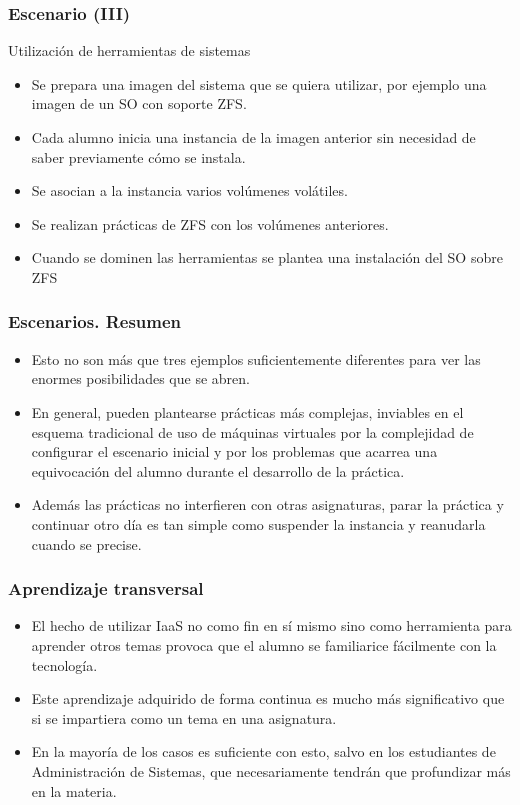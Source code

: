 \documentclass{beamer}
\begin{document}
\begin{frame}
  \frametitle{Escenario (III)}
  \begin{description}
  \item[Utilización de herramientas de sistemas]
  \end{description}
  \begin{itemize}
  \item Se prepara una imagen del sistema que se quiera utilizar, por ejemplo
    una imagen de un SO con soporte ZFS.
  \item Cada alumno inicia una instancia de la imagen anterior sin necesidad de
    saber previamente cómo se instala.
  \item Se asocian a la instancia varios volúmenes volátiles.
  \item Se realizan prácticas de ZFS con los volúmenes anteriores.
  \item Cuando se dominen las herramientas se plantea una instalación del SO
    sobre ZFS
  \end{itemize}
\end{frame}

\begin{frame}
  \frametitle{Escenarios. Resumen}
  \begin{itemize}
  \item Esto no son más que tres ejemplos suficientemente diferentes para ver
    las enormes posibilidades que se abren.
  \item En general, pueden plantearse prácticas más complejas, inviables en el
    esquema tradicional de uso de máquinas virtuales por la complejidad de
    configurar el escenario inicial y por los problemas que acarrea una
    equivocación del alumno durante el desarrollo de la práctica.
  \item Además las prácticas no interfieren con otras asignaturas, parar la
    práctica y continuar otro día es tan simple como suspender la instancia y
    reanudarla cuando se precise.
  \end{itemize}
\end{frame}

\begin{frame}
  \frametitle{Aprendizaje transversal}
  \begin{itemize}
  \item El hecho de utilizar IaaS no como fin en sí mismo sino como herramienta
    para aprender otros temas provoca que el alumno se familiarice fácilmente
    con la tecnología.
  \item Este aprendizaje adquirido de forma continua es mucho más significativo
    que si se impartiera como un tema en una asignatura.
  \item En la mayoría de los casos es suficiente con esto, salvo en los
    estudiantes de Administración de Sistemas, que necesariamente tendrán que
    profundizar más en la materia.
  \end{itemize}
\end{frame}
\end{document}
